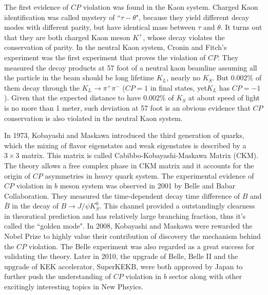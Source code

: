 The first evidence of $CP$ violation was found in the Kaon system. Charged Kaon identification was called mystery of ``$\tau - \theta$", because they yield different decay modes with different parity, but have identical mass between $\tau$ and $\theta$. It turns out that they are both charged Kaon meson $K^{+}$, whose decay violates the conservation of parity. In the neutral Kaon system, Cronin and Fitch's experiment was the first experiment that proves the violation of $CP$. They measured the decay products at 57 foot of a neutral kaon beamline assuming all the particle in the beam should be long lifetime $K_L$, nearly no $K_S$. But 0.002\% of them decay through the $K_L \to \pi^+ \pi^-$ ($CP=1$ in final states, yet$K_L$ has  $CP=-1$ ). Given that the expected distance to have 0.002\% of $K_S$ at about speed of light is no more than 1 meter, such deviation at 57 foot is an obvious evidence that $CP$ conservation is also violated in the neutral Kaon system.

In 1973, Kobayashi and Maskawa introduced the third generation of quarks, which the mixing of flavor eigenstates and weak eigenstates is described by a $3\times3$ matrix. This matrix is called Cabibbo-Kobayashi-Maskawa Matrix (CKM)\cite{CKM}. The theory allows a free complex phase in CKM matrix and it accounts for the origin of $CP$ asymmetries in heavy quark system. The experimental evidence of $CP$ violation in $b$ meson system was observed in 2001 by Belle and Babar Collaboration. They measured the time-dependent decay time difference of $B$ and $\bar{B}$ in the decay of $B\to J/\psi K_S^0$. This channel provided a outstandingly clearness in theoratical prediction and has relatively large branching fraction, thus it's called the ``golden mode". In 2008, Kobayashi and Maskawa were rewarded the Nobel Prize to highly value their contribution of discovery the mechanism behind the $CP$ violation. The Belle experiment was also regarded as a great success for validating the theory. Later in 2010, the upgrade of Belle, Belle II and the upgrade of KEK accelerator, SuperKEKB, were both approved by Japan to further push the understanding of $CP$ violation in $b$ sector along with other excitingly interesting topics in New Phsyics. 

